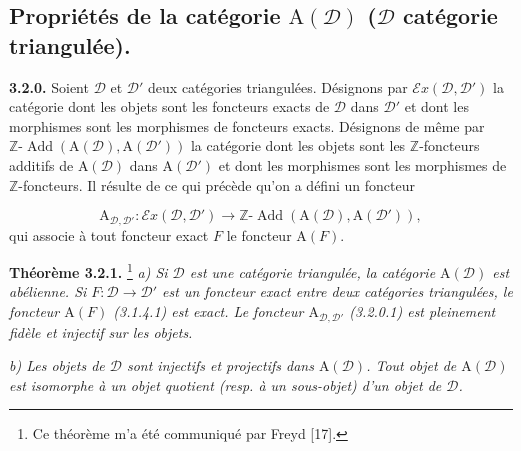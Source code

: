 \clearpage
{}%
\begingroup
\small
\setlength{\parskip}{0pt}%
\setlength{\emergencystretch}{1.5em}%

\subsection{Propriétés de la catégorie
  \texorpdfstring{$\mathrm A(\mathcal D)$}{A(D)}
  (\texorpdfstring{$\mathcal D$}{D} catégorie triangulée).}

\noindent\textbf{3.2.0.}\quad
Soient $\mathcal D$ et $\mathcal D'$ deux catégories triangulées. Désignons
par $\mathcal E x(\mathcal D,\mathcal D')$ la catégorie dont les objets sont
les foncteurs exacts de $\mathcal D$ dans $\mathcal D'$ et dont les
morphismes sont les morphismes de foncteurs exacts. Désignons de même par
$\mathbb Z\text{-}\operatorname{Add}(\mathrm A(\mathcal D),
\mathrm A(\mathcal D'))$ la catégorie dont les objets sont les
$\mathbb Z$-foncteurs additifs de $\mathrm A(\mathcal D)$ dans
$\mathrm A(\mathcal D')$ et dont les morphismes sont les morphismes de
$\mathbb Z$-foncteurs. Il résulte de ce qui précède qu'on a défini un
foncteur

\[
\mathrm A_{\mathcal D,\mathcal D'}\colon
\mathcal E x(\mathcal D,\mathcal D')
\longrightarrow
\mathbb Z\text{-}\operatorname{Add}
(\mathrm A(\mathcal D),\mathrm A(\mathcal D')),
\tag{3.2.0.1}
\]
qui associe à tout foncteur exact $F$ le foncteur $\mathrm A(F)$.

\medskip
\noindent\textbf{Théorème 3.2.1.}\begingroup\renewcommand{\thefootnote}{(*)}%
\footnote{Ce théorème m'a été communiqué par Freyd [17].}\endgroup\quad
\textit{a) Si $\mathcal D$ est une catégorie triangulée, la catégorie
$\mathrm A(\mathcal D)$ est abélienne. Si
$F\colon\mathcal D\to\mathcal D'$ est un foncteur exact entre deux
catégories triangulées, le foncteur $\mathrm A(F)$ (3.1.4.1) est exact. Le
foncteur $\mathrm A_{\mathcal D,\mathcal D'}$ (3.2.0.1) est pleinement fidèle
et injectif sur les objets.}

\textit{b) Les objets de $\mathcal D$ sont injectifs et projectifs dans
$\mathrm A(\mathcal D)$. Tout objet de $\mathrm A(\mathcal D)$ est isomorphe
à un objet quotient (resp. à un sous-objet) d'un objet de $\mathcal D$.}


